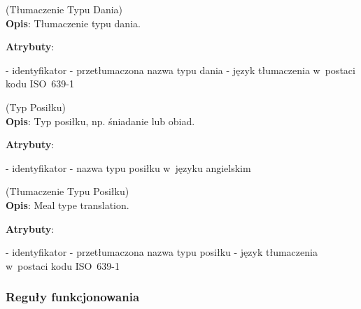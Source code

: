 \begin{enumerate}[label={\textbf{KAT/3/\protect\twodigits{\theenumi}}}, wide, labelwidth=!, labelindent=0pt, labelsep=0pt, series=reqs]
    \label{kat:DishTypeTranslation} (Tłumaczenie Typu Dania)\\
    \indent\textbf{Opis}: Tłumaczenie typu dania.
    \par
    \textbf{Atrybuty}:
    \begin{itemize}[series=atr, wide, align=left, leftmargin=190pt]
        \label{kat:DishTypeTranslation:id}- identyfikator
        \label{kat:DishTypeTranslation:translation}- przetłumaczona nazwa typu dania
        \label{kat:DishTypeTranslation:language}- język tłumaczenia w~postaci kodu ISO~639-1
    \end{itemize}

    \label{kat:MealType} (Typ Posiłku)\\
    \indent\textbf{Opis}: Typ posiłku, np. śniadanie lub obiad.
    \par
    \textbf{Atrybuty}:
    \begin{itemize}[series=atr, wide, align=left, leftmargin=190pt]
        \label{kat:MealType:id}- identyfikator
        \label{kat:MealType:name}- nazwa typu posiłku w~języku angielskim
    \end{itemize}

    \label{kat:MealTypeTranslation} (Tłumaczenie Typu Posiłku)\\
    \indent\textbf{Opis}: Meal type translation.
    \par
    \textbf{Atrybuty}:
    \begin{itemize}[series=atr, wide, align=left, leftmargin=190pt]
        \label{kat:MealTypeTranslation:id}- identyfikator
        \label{kat:MealTypeTranslation:translation}- przetłumaczona nazwa typu posiłku
        \label{kat:MealTypeTranslation:language}- język tłumaczenia w~postaci kodu ISO~639-1
    \end{itemize}

\end{enumerate}

\subsubsection{Reguły funkcjonowania}\label{subsubsec:database:recipes:functionalRules}

